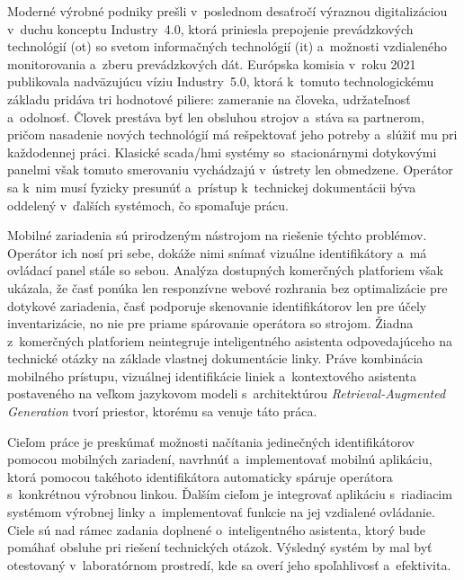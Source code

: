 Moderné výrobné podniky prešli v~poslednom desaťročí výraznou digitalizáciou
v~duchu konceptu Industry~4.0, ktorá priniesla prepojenie prevádzkových
technológií (\acrshort{ot}) so svetom informačných technológií
(\acrshort{it}) a~možnosti vzdialeného monitorovania a~zberu prevádzkových
dát. Európska komisia v~roku 2021 publikovala nadväzujúcu víziu
Industry~5.0, ktorá k~tomuto technologickému základu pridáva tri hodnotové
piliere: zameranie na človeka, udržateľnosť a~odolnosť.
Človek prestáva byť len obsluhou strojov a~stáva sa partnerom, pričom
nasadenie nových technológií má rešpektovať jeho potreby a~slúžiť mu pri
každodennej práci. Klasické \acrshort{scada}/\acrshort{hmi} systémy
so~stacionárnymi dotykovými panelmi však tomuto
smerovaniu vychádzajú v~ústrety len obmedzene. Operátor sa k~nim musí
fyzicky presunúť a~prístup k~technickej dokumentácii býva oddelený v~ďalších systémoch, čo
spomaľuje prácu.

Mobilné zariadenia sú prirodzeným nástrojom na riešenie týchto problémov.
Operátor ich nosí pri sebe, dokáže nimi snímať vizuálne identifikátory
a~má ovládací panel stále so sebou. Analýza dostupných komerčných platforiem však ukázala, že
časť ponúka len responzívne webové rozhrania bez optimalizácie
pre dotykové zariadenia, časť podporuje skenovanie identifikátorov len pre účely inventarizácie,
no nie pre priame spárovanie operátora so strojom. Žiadna z~komerčných platforiem
neintegruje inteligentného asistenta odpovedajúceho na technické otázky na
základe vlastnej dokumentácie linky. Práve kombinácia mobilného
prístupu, vizuálnej identifikácie liniek a~kontextového asistenta
postaveného na veľkom jazykovom modeli s~architektúrou
\textit{Retrieval-Augmented Generation} tvorí priestor,
ktorému sa venuje táto práca.

Cieľom práce je preskúmať možnosti načítania
jedinečných identifikátorov pomocou mobilných zariadení, navrhnúť
a~implementovať mobilnú aplikáciu, ktorá pomocou takéhoto identifikátora
automaticky spáruje operátora s~konkrétnou výrobnou linkou. Ďalším cieľom je integrovať
aplikáciu s~riadiacim systémom výrobnej linky a~implementovať funkcie na
jej vzdialené ovládanie. Ciele sú nad rámec zadania doplnené
o~inteligentného asistenta, ktorý bude pomáhať obsluhe pri riešení technických
otázok. Výsledný systém by mal byť otestovaný v~laboratórnom prostredí,
kde sa overí jeho spoľahlivosť a~efektivita.


